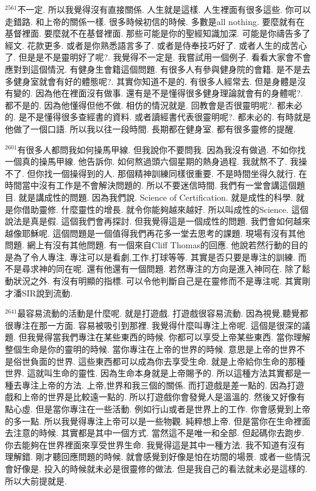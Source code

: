 \documentclass{book}
\begin{document}
$^{2561}$不一定.
所以我覺得沒有直接關係.
人生就是這樣.
人生裡面有很多這些.
你可以走錯路.
和上帝的關係一樣.
很多時候初信的時候.
多數是all nothing.
要麼就有在基督裡面.
要麼就不在基督裡面.
那些可能是你的聖經知識加深.
可能是你禱告多了經文.
花款更多.
或者是你熟悉語言多了.
或者是侍奉技巧好了.
或者人生的成苦心了.
但是是不是靈明好了呢?.
我覺得不一定是.
我嘗試用一個例子.
看看大家會不會應對到這個情況.
有健身生會籍這個問題.
有很多人有參與健身院的會籍.
是不是去多健身室就會有好的體態呢?.
其實你知道不是的.
有很多人經常去.
但是身體是沒有變的.
因為他在裡面沒有做事.
還有是不是懂得很多健身理論就會有的身體呢?.
都不是的.
因為他懂得但他不做.
相仿的情況就是.
回教會是否很靈明呢?.
都未必的.
是不是懂得很多查經書的資料.
或者讀經書代表很靈明呢?.
都未必的.
有時就是他做了一個口語.
所以我以往一段時間.
長期都在健身室.
都有很多靈修的提醒.

$^{2601}$有很多人都問我如何操馬甲線.
但我說你不要問我.
因為我沒有做過.
不如你找一個真的操馬甲線.
他告訴你.
如何熬過頭六個星期的熱身過程.
我就熬不了.
我操不了.
但你找一個操得到的人.
那個精神訓練同樣很重要.
不是時間坐得久就行.
在時間當中沒有工作是不會解決問題的.
所以不要迷信時間.
我們有一堂會講這個題目.
就是講成性的問題.
因為我們說.
Science of Certification.
就是成性的科學.
就是你借助靈修.
什麼靈性的增長.
就令你能夠越來越好.
所以叫成性的Science.
這個說法是真是假.
這個我們會再探討.
但我覺得這是一個成性的問題.
我們會如何越來越像耶穌呢.
這個問題是一個值得我們再花多一堂去思考的課題.
現場有沒有其他問題.
網上有沒有其他問題.
有一個來自Cliff Thomas的回應.
他說若然行動的目的是為了令人專注.
專注可以是看劇,工作,打球等等.
其實是否只要是專注的訓練.
而不是尋求神的同在呢.
還有他還有一個問題.
若然專注的方向是進入神同在.
除了鬆動狀況之外.
有沒有明顯的指標.
可以令他判斷自己是在靈修而不是專注呢.
其實剛才潘SIR說到流動.

$^{2641}$最容易流動的活動是什麼呢.
就是打遊戲.
打遊戲很容易流動.
因為視覺,聽覺都很專注在那一方面.
容易被吸引到那裡.
我覺得什麼叫專注上帝呢.
這個是很深的議題.
但我覺得當我們專注在某些東西的時候.
你都可以享受上帝某些東西.
當你理解整個生命是你的靈明的時候.
當你專注在上帝的世界的時候.
意思是上帝的世界不是俗世負面的世界.
這些東西都可以成為你去享受生命.
就是上帝給你生命的那種世界.
這就叫生命的靈性.
因為生命本身就是上帝賜予的.
所以這種方法其實都是一種去專注上帝的方法.
上帝,世界和我三個的關係.
而打遊戲是差一點的.
因為打遊戲和上帝的世界是比較遠一點的.
所以打遊戲你會發覺人是溫溫的.
然後又好像有點心虛.
但是當你專注在一些活動.
例如行山或者是世界上的工作.
你會感覺到上帝的多一點.
所以我覺得專注上帝可以是一些物觀.
純粹想上帝.
但是當你在生命裡面去注意的時候.
其實都是其中一個方式.
當然這不是唯一和全部.
但起碼你去跑步.
你去能夠在世界裡面來享受世界生命.
我覺得這是其中一種方法.
我不知道有沒有理解錯.
剛才聽回應問題的時候.
就會感覺到好像是怕在坊間的場景.
或者一些情況會好像是.
投入的時候就未必是很靈修的做法.
但是我自己的看法就未必是這樣的.
所以大前提就是.
\end{document}
